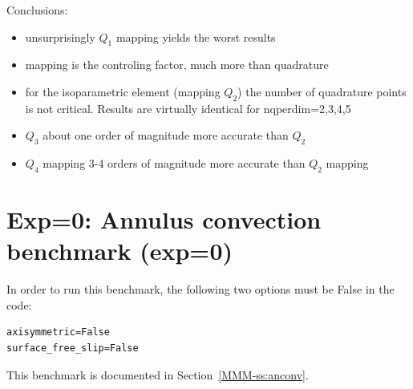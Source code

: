 \noindent Conclusions:
\begin{itemize}
\item unsurprisingly $Q_1$ mapping yields the worst results
\item mapping is the controling factor, much more than quadrature
\item for the isoparametric element (mapping $Q_2$) the number of quadrature points 
is not critical. Results are virtually identical for {\python nqperdim=2,3,4,5}
\item $Q_3$ about one order of magnitude more accurate than $Q_2$ 
\item $Q_4$ mapping 3-4 orders of magnitude more accurate than $Q_2$ mapping
\end{itemize}

\newpage
\section*{Exp=0: Annulus convection benchmark (exp=0)}

In order to run this benchmark, the following two options must be False in the code:
\begin{lstlisting}
axisymmetric=False
surface_free_slip=False
\end{lstlisting}

This benchmark is documented in Section~\ref{MMM-ss:anconv}.


